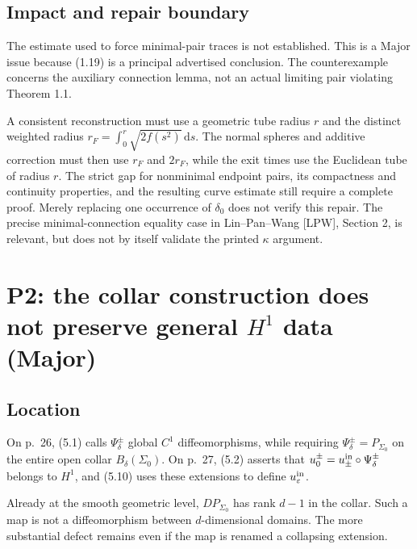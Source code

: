 \documentclass[10pt]{article}
\begin{document}
\subsection*{Impact and repair boundary}
The estimate used to force minimal-pair traces is not established. This is a Major issue because (1.19) is a principal advertised conclusion. The counterexample concerns the auxiliary connection lemma, not an actual limiting pair violating Theorem 1.1.\par
A consistent reconstruction must use a geometric tube radius \(r\) and the distinct weighted radius \(r_F=\int_0^r\sqrt{2f(s^2)}\,\mathrm ds\). The normal spheres and additive correction must then use \(r_F\) and \(2r_F\), while the exit times use the Euclidean tube of radius \(r\). The strict gap for nonminimal endpoint pairs, its compactness and continuity properties, and the resulting curve estimate still require a complete proof. Merely replacing one occurrence of \(\delta_0\) does not verify this repair. The precise minimal-connection equality case in Lin–Pan–Wang [LPW], Section 2, is relevant, but does not by itself validate the printed \(\kappa\) argument.\par
\section*{P2: the collar construction does not preserve general \(H^1\) data (Major)}
\subsection*{Location}
On p. 26, (5.1) calls \(\Psi_\delta^\pm\) global \(C^1\) diffeomorphisms, while requiring \(\Psi_\delta^\pm=P_{\Sigma_0}\) on the entire open collar \(B_\delta(\Sigma_0)\). On p. 27, (5.2) asserts that \(u_0^\pm=u_{\pm}^{\rm in}\circ\Psi_\delta^\pm\) belongs to \(H^1\), and (5.10) uses these extensions to define \(u_\varepsilon^{\rm in}\).\par
Already at the smooth geometric level, \(DP_{\Sigma_0}\) has rank \(d-1\) in the collar. Such a map is not a diffeomorphism between \(d\)-dimensional domains. The more substantial defect remains even if the map is renamed a collapsing extension.\par
\end{document}
